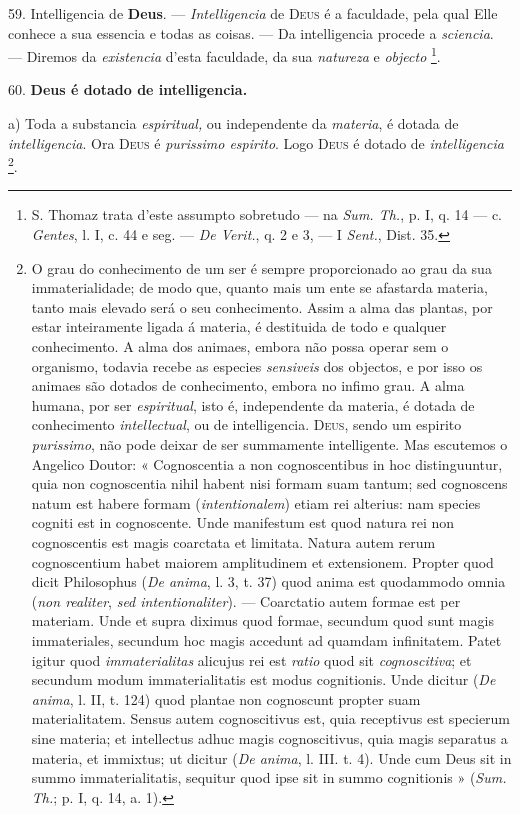 59. Intelligencia de \textbf{Deus}. --- \emph{Intelligencia} de \textsc{Deus} é a faculdade, pela qual Elle conhece a sua essencia e todas as coisas. --- Da intelligencia procede a \emph{sciencia}. --- Diremos da \emph{existencia} d'esta faculdade, da sua \emph{natureza} e \emph{objecto} \footnote{S. Thomaz trata d'este assumpto sobretudo --- na \emph{Sum. Th.}, p. I, q. 14 --- c. \emph{Gentes}, l. I, c. 44 e seg. --- \emph{De Verit.}, q. 2 e 3, --- I \emph{Sent.}, Dist. 35.}.

60. \textbf{Deus é dotado de intelligencia.}

a) Toda a substancia \emph{espiritual,} ou independente da \emph{materia}, é dotada de \emph{intelligencia}. Ora \textsc{Deus} é \emph{purissimo espirito}. Logo \textsc{Deus} é dotado de \emph{intelligencia} \footnote{O grau do conhecimento de um ser é sempre proporcionado ao grau da sua immaterialidade; de modo que, quanto mais um ente se afastarda materia, tanto mais elevado será o seu conhecimento. Assim a alma das plantas, por estar inteiramente ligada á materia, é destituida de todo e qualquer conhecimento. A alma dos animaes, embora não possa operar sem o organismo, todavia recebe as especies \emph{sensiveis} dos objectos, e por isso os animaes são dotados de conhecimento, embora no infimo grau. A alma humana, por ser \emph{espiritual}, isto é, independente da materia, é dotada de conhecimento \emph{intellectual}, ou de intelligencia. \textsc{Deus}, sendo um espirito \emph{purissimo}, não pode deixar de ser summamente intelligente. Mas escutemos o Angelico Doutor: « Cognoscentia a non cognoscentibus in hoc distinguuntur, quia non cognoscentia nihil habent nisi formam suam tantum; sed cognoscens natum est habere formam (\emph{intentionalem}) etiam rei alterius: nam species cogniti est in cognoscente. Unde manifestum est quod natura rei non cognoscentis est magis coarctata et limitata. Natura autem rerum cognoscentium habet maiorem amplitudinem et extensionem. Propter quod dicit Philosophus (\emph{De anima}, l. 3, t. 37) quod anima est quodammodo omnia (\emph{non realiter}, \emph{sed intentionaliter}). --- Coarctatio autem formae est per materiam. Unde et supra diximus quod formae, secundum quod sunt magis immateriales, secundum hoc magis accedunt ad quamdam infinitatem. Patet igitur quod \emph{immaterialitas} alicujus rei est \emph{ratio} quod sit \emph{cognoscitiva}; et secundum modum immaterialitatis est modus cognitionis. Unde dicitur (\emph{De anima}, l. II, t. 124) quod plantae non cognoscunt propter suam materialitatem. Sensus autem cognoscitivus est, quia receptivus est specierum sine materia; et intellectus adhuc magis cognoscitivus, quia magis separatus a materia, et immixtus; ut dicitur (\emph{De anima}, l. III. t. 4). Unde cum Deus sit in summo immaterialitatis, sequitur quod ipse sit in summo cognitionis » (\emph{Sum. Th.}; p. I, q. 14, a. 1).}.


